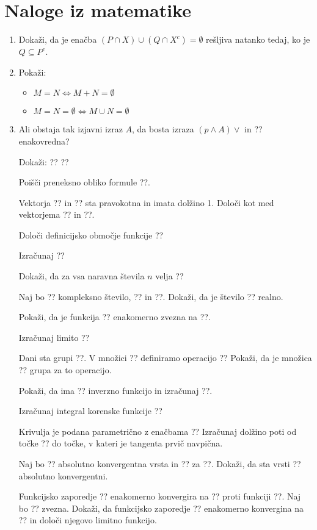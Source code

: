 \documentclass[a4paper,12pt]{article}
\begin{document}
\section*{Naloge iz matematike}

\begin{enumerate}    
\item Dokaži, da je enačba $(P\cap X)\cup (Q\cap X^c)=\emptyset$
rešljiva natanko tedaj, ko je $Q\subseteq P^c$.

\item Pokaži:
\begin{itemize}
\item $M=N\iff M+N=\emptyset$
\item $M=N=\emptyset \iff M\cup N = \emptyset$
\end{itemize}

\item Ali obstaja tak izjavni izraz $A$, da bosta izraza
$(p\wedge A)\vee $ in ??
enakovredna?

Dokaži:
??
??

Poišči preneksno obliko formule ??.

Vektorja ?? in ??
sta pravokotna in imata dolžino 1. Določi kot med vektorjema ?? in ??.

Določi definicijsko območje funkcije
??

Izračunaj
??

Dokaži, da za vsa naravna števila $n$ velja
??

Naj bo ?? kompleksno število, ?? in ??.
Dokaži, da je število ?? realno.

Pokaži, da je funkcija ?? enakomerno zvezna na ??.

Izračunaj limito
??

Dani sta grupi ??. V množici ?? definiramo operacijo
??
Pokaži, da je množica ?? grupa za to operacijo.

Pokaži, da ima ?? inverzno funkcijo in izračunaj ??.

Izračunaj integral korenske funkcije
??

Krivulja je podana parametrično z enačbama
??
Izračunaj dolžino poti od točke ?? do točke, v kateri je tangenta prvič navpična.

Naj bo ?? absolutno konvergentna vrsta in ?? za ??.
Dokaži, da sta vrsti
??
absolutno konvergentni.

Funkcijsko zaporedje ?? enakomerno konvergira na ?? proti funkciji ??.
Naj bo ?? zvezna. Dokaži, da funkcijsko zaporedje ??
enakomerno konvergina na ?? in določi njegovo limitno funkcijo.


\end{enumerate}
\end{document}
